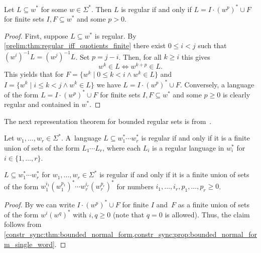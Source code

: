 \begin{proposition}\label{constr_sync:prop:bounded_normal_form_single_word}
	Let $L \subseteq w^*$ for some $w \in \Sigma^*$.
	Then $L$ is regular if and only 
	if $L = I \cdot (w^p)^* \cup F$
	for finite sets $I, F \subseteq w^*$ and some $p > 0$.
\end{proposition}
\begin{proof} 
	First, suppose $L \subseteq w^*$ is regular. By \cref{prelim:thm:regular_iff_quotients_finite}
	there exist $0 \le i < j$ such that
	$(w^{i})^{-1} L = (w^j)^{-1} L$. 
	Set $p = j - i$. Then, for all $k \ge i$ this gives
	\[
	w^k \in L \Leftrightarrow w^{k + p} \in L.
	\]
	This yields that for $F = \{ w^k \mid 0 \le k < i \land w^k \in L \}$ and
	$I = \{ w^k \mid i \le k < j \land w^k \in L \}$
	we have $L = I\cdot (w^p)^* \cup F$.		
	Conversely, a language of the form $L = I \cdot (w^p)^* \cup F$
	for finite sets $I, F \subseteq w^*$ and some $p \ge 0$
	is clearly regular and contained in $w^*$.
\end{proof}

The next representation theorem for bounded regular sets is from~\cite[Thm.~1.2]{GinsburgSpanier66}.

\begin{theorem}
	\label{constr_sync:thm:bounded_normal_form}
	Let $w_1, \ldots, w_r \in \Sigma^*$.
	A~language $L \subseteq w_1^* \cdots w_r^*$ is regular if and only if
	it is a finite union of sets of the form $L_1 \cdots L_r$,
	where each $L_i$ is a regular language in $w_i^*$ for $i \in \{1,\ldots,r\}$.
\end{theorem} 

\begin{corollary}\label{constr_sync:cor:bounded_normal_form_single_state_aut}
	$L \subseteq w_1^* \cdots w_r^*$ 
	for $w_1, \ldots, w_r \in \Sigma^*$
	is regular if and only if
	it is a finite union of sets of the form $w_1^{i_1} (w_1^{p_1})^* \cdots w_r^{i_r} (w_r^{p_r})^*$
	for numbers $i_1, \ldots, i_r, p_1, \ldots, p_r \ge 0$.
\end{corollary}
\begin{proof}
	By  
	we can write  $I \cdot (w^p)^* \cup F$ 
	for finite $I$ and~$F$ as a finite union
	of sets of the form $w^i (w^q)^*$
	with $i, q \ge 0$ (note that $q = 0$ is allowed).
	Thus, the claim follows
	from \cref{constr_sync:thm:bounded_normal_form,constr_sync:prop:bounded_normal_form_single_word}.
\end{proof}

